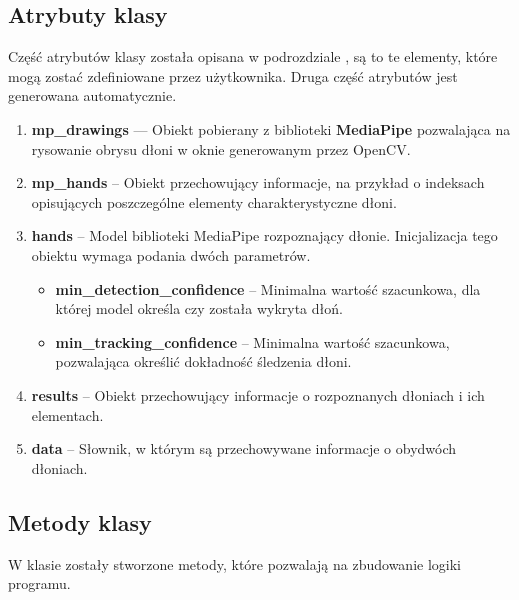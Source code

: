 

\subsection{Atrybuty klasy}

\quad Część atrybutów klasy została opisana w podrozdziale \textbf{}, są to te elementy, które mogą zostać zdefiniowane przez użytkownika. Druga część atrybutów jest generowana automatycznie. 

\begin{enumerate}
    \item \textbf{mp\_drawings} --- Obiekt pobierany z biblioteki \textbf{MediaPipe} pozwalająca na rysowanie obrysu dłoni w oknie generowanym przez OpenCV.
    \item \textbf{mp\_hands} -- Obiekt przechowujący informacje, na przykład o indeksach opisujących poszczególne elementy charakterystyczne dłoni. 
    \item \textbf{hands} -- Model biblioteki MediaPipe rozpoznający dłonie. Inicjalizacja tego obiektu wymaga podania dwóch parametrów. 
    \begin{itemize}
        \item \textbf{min\_detection\_confidence} -- Minimalna wartość szacunkowa, dla której model określa czy została wykryta dłoń.
        \item \textbf{min\_tracking\_confidence} -- Minimalna wartość szacunkowa, pozwalająca określić dokładność śledzenia dłoni. 
    \end{itemize}
    \item \textbf{results} -- Obiekt przechowujący informacje o rozpoznanych dłoniach i ich elementach. 
    \item \textbf{data} -- Słownik, w którym są przechowywane informacje o obydwóch dłoniach. 
\end{enumerate}

\subsection{Metody klasy}

\quad W klasie zostały stworzone metody, które pozwalają na zbudowanie logiki programu. 

